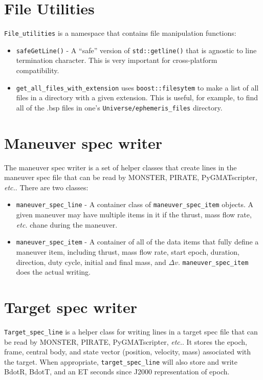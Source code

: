 \section{File Utilities}
\label{sec:file_utilities}

\texttt{File\_utilities} is a namespace that contains file manipulation functions:

\begin{itemize}
	\item \texttt{safeGetLine()} - A ``safe'' version of \texttt{std::getline()} that is agnostic to line termination character. This is very important for cross-platform compatibility.
	\item \texttt{get\_all\_files\_with\_extension} uses \texttt{boost::filesytem} to make a list of all files in a directory with a given extension. This is useful, for example, to find all of the .bsp files in one's \texttt{Universe/ephemeris\_files} directory.
\end{itemize}

\section{Maneuver spec writer}
\label{sec:maneuver_spec_writer}

The maneuver spec writer is a set of helper classes that create lines in the maneuver spec file that can be read by MONSTER, PIRATE, PyGMATscripter, \textit{etc.}. There are two classes:

\begin{itemize}
	\item \texttt{maneuver\_spec\_line} - A container class of \texttt{maneuver\_spec\_item} objects. A given maneuver may have multiple items in it if the thrust, mass flow rate, \textit{etc.} chane during the maneuver.
	\item \texttt{maneuver\_spec\_item} - A container of all of the data items that fully define a maneuver item, including thrust, mass flow rate, start epoch, duration, direction, duty cycle, initial and final mass, and $\Delta v$. \texttt{maneuver\_spec\_item} does the actual writing.
\end{itemize}

\section{Target spec writer}
\label{sec:target_spec_writer}

\texttt{Target\_spec\_line} is a helper class for writing lines in a target spec file that can be read by MONSTER, PIRATE, PyGMATscripter, \textit{etc.}. It stores the epoch, frame, central body, and state vector (position, velocity, mass) associated with the target. When appropriate, \texttt{target\_spec\_line} will also store and write BdotR, BdotT, and an ET seconds since J2000 representation of epoch.

